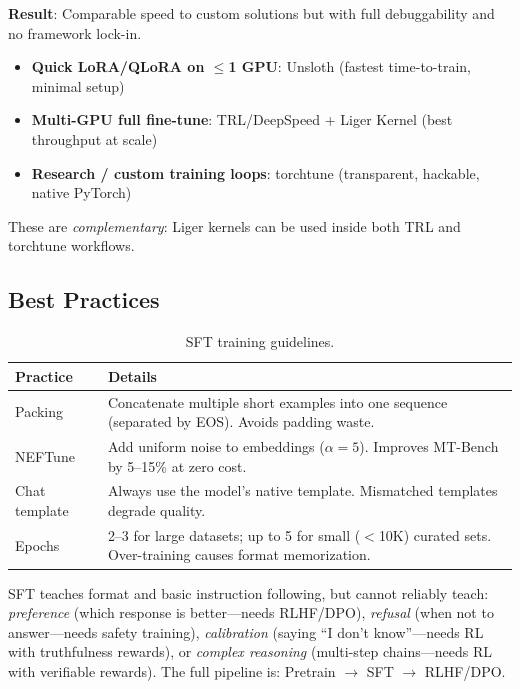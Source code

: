 \textbf{Result}: Comparable speed to custom solutions but with full debuggability and no framework lock-in.

\begin{keybox}
\begin{itemize}
  \item \textbf{Quick LoRA/QLoRA on $\leq$1 GPU}: Unsloth (fastest time-to-train, minimal setup)
  \item \textbf{Multi-GPU full fine-tune}: TRL/DeepSpeed + Liger Kernel (best throughput at scale)
  \item \textbf{Research / custom training loops}: torchtune (transparent, hackable, native PyTorch)
\end{itemize}

These are \emph{complementary}: Liger kernels can be used inside both TRL and torchtune workflows.
\end{keybox}

\subsection{Best Practices}
\label{best-practices}

\begin{table}[ht!]
\centering
\caption{SFT training guidelines.}
\begin{tabular}{@{}lp{11cm}@{}}
\toprule
\textbf{Practice} & \textbf{Details} \\
\midrule
Packing & Concatenate multiple short examples into one sequence (separated by EOS). Avoids padding waste. \\
NEFTune~\cite{jain2024neftune} & Add uniform noise to embeddings ($\alpha=5$). Improves MT-Bench by 5--15\% at zero cost. \\
Chat template & Always use the model’s native template. Mismatched templates degrade quality. \\
Epochs & 2--3 for large datasets; up to 5 for small ($<$10K) curated sets. Over-training causes format memorization. \\
\bottomrule
\end{tabular}
\end{table}

\begin{intuitionbox}
SFT teaches format and basic instruction following, but cannot reliably teach: \emph{preference} (which response is better---needs RLHF/DPO), \emph{refusal} (when not to answer---needs safety training), \emph{calibration} (saying ``I don’t know''---needs RL with truthfulness rewards), or \emph{complex reasoning} (multi-step chains---needs RL with verifiable rewards). The full pipeline is: Pretrain $\to$ SFT $\to$ RLHF/DPO.
\end{intuitionbox}

